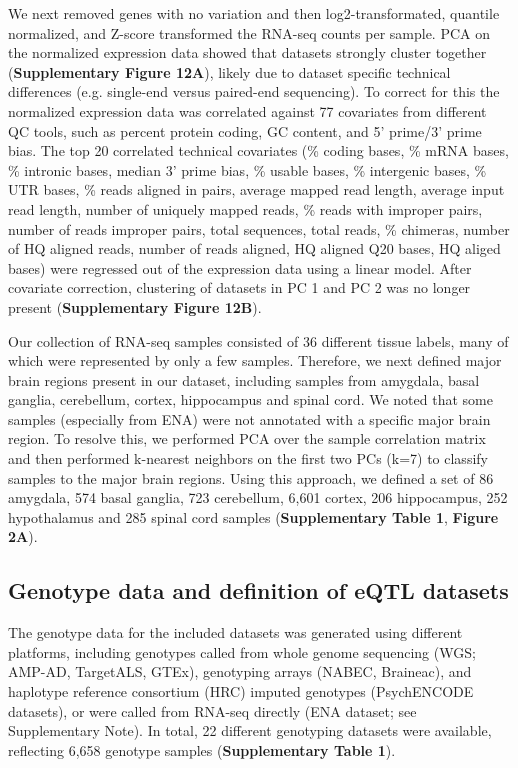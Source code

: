 {{We next removed genes with no variation and then log2-transformated, quantile normalized, and Z-score transformed the RNA-seq counts per sample. PCA on the normalized expression data showed that datasets strongly cluster together (\textbf{Supplementary Figure 12A}), likely due to dataset specific technical differences (e.g. single-end versus paired-end sequencing). To correct for this the normalized expression data was correlated against 77 covariates from different QC tools, such as percent protein coding, GC content, and 5’ prime/3’ prime bias. The top 20 correlated technical covariates (\% coding bases, \% mRNA bases, \% intronic bases, median 3’ prime bias, \% usable bases, \% intergenic bases, \% UTR bases, \% reads aligned in pairs, average mapped read length, average input read length, number of uniquely mapped reads, \% reads with improper pairs, number of reads improper pairs, total sequences, total reads, \% chimeras, number of HQ aligned reads, number of reads aligned, HQ aligned Q20 bases, HQ aliged bases) were regressed out of the expression data using a linear model. After covariate correction, clustering of datasets in PC 1 and PC 2 was no longer present (\textbf{Supplementary Figure 12B}).  

Our collection of RNA-seq samples consisted of 36 different tissue labels, many of which were represented by only a few samples. Therefore, we next defined major brain regions present in our dataset, including samples from amygdala, basal ganglia, cerebellum, cortex, hippocampus and spinal cord. We noted that some samples (especially from ENA) were not annotated with a specific major brain region. To resolve this, we performed PCA over the sample correlation matrix and then performed k-nearest neighbors on the first two PCs (k=7) to classify samples to the major brain regions. Using this approach, we defined a set of 86 amygdala, 574 basal ganglia, 723 cerebellum, 6,601 cortex, 206 hippocampus, 252 hypothalamus and 285 spinal cord samples (\textbf{Supplementary Table 1}, \textbf{Figure 2A}). 



\subsection{Genotype data and definition of eQTL datasets}
The genotype data for the included datasets was generated using different platforms, including genotypes called from whole genome sequencing (WGS; AMP-AD, TargetALS, GTEx\cite{consortiumGTExConsortiumAtlas2020}), genotyping arrays (NABEC, Braineac\cite{ramasamyGeneticVariabilityRegulation2014}), and haplotype reference consortium (HRC)\cite{mccarthyReferencePanel642016} imputed genotypes (PsychENCODE datasets), or were called from RNA-seq directly (ENA dataset; see Supplementary Note). In total, 22 different genotyping datasets were available, reflecting 6,658 genotype samples (\textbf{Supplementary Table 1}).  

}}
